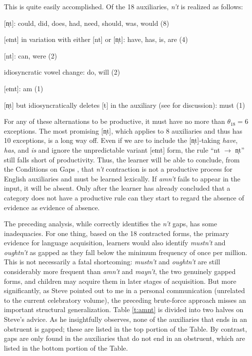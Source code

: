 \documentclass[output=paper,
modfonts
]{LSP/langsci}
\begin{document}
This is quite easily accomplished. Of the 18 auxiliaries,
\textit{n't} is realized as follows:
\begin{exe}  \ex \begin{xlist}
\item {[n̩t]}: could,
  did, does, had, need, should, was, would (8)
\item   {[eɪnt]} in variation
with either [nt] or [n̩t]:  have, has, is, are (4)
\item {[nt]}: can, were (2)
\item idiosyncratic vowel change: do, will (2)
\item {[eɪnt]}: am (1)
\item {[n̩t]}  but
  idiosyncratically deletes [t] in the auxiliary (see \citealt[][
  p508-9]{Zwicky1983a}   for discussion): must (1)
\end{xlist} \end{exe}
For any of these alternations to be productive, it must have no more
than $\theta_{18} = 6$ exceptions. The most promising
[n̩t], which applies to 8 auxiliaries and thus has 10
exceptions, is a long way off. Even if we are to include the
[n̩t]-taking \textit{have}, \textit{has}, and \textit{is} and
ignore the unpredictable variant [eɪnt] form, the rule ``nt
$\longrightarrow$ n̩t'' still falls short of
productivity. Thus, the 
learner will be able to conclude, from the Conditions on Gaps
, that \textit{n't} contraction is not a productive
process for English auxiliaries and must be learned lexically. If \textit{amn't} fails to appear in the input, it will be absent. Only after
the learner has already concluded that a category does not have a
productive rule can they start to regard the absence of evidence as
evidence of absence. 


The preceding analysis, while correctly identifies the \textit{n't} gaps,
has some inadequacies.  For one thing, based on the 18 contracted
forms, the primary evidence for language acquisition, learners would
also identify \textit{mustn't} and \textit{oughtn't} as gapped as they fall
below the minimum frequency of once per million. 
This is not necessarily a fatal shortcoming: 
\textit{mustn't} and \textit{oughtn't} are still 
considerably more frequent than \textit{amn't} and \textit{mayn't}, the two
genuinely  gapped forms, and children may acquire them in later stages of
acquisition.  But more significantly, as Steve pointed out 
to me in a personal communication (unrelated to the current
celebratory volume), the preceding brute-force approach 
misses an important structural generalization. Table
\ref{t:amnt} is divided into two halves on Steve's advice.  As he
insightfully observes,  none of the auxiliaries that ends in an
obstruent is gapped; these are listed in the top portion of the
Table. By contrast, gaps are only found in the 
auxiliaries that do not end in an obstruent, which are listed in the bottom
portion of the Table. 
\end{document}
